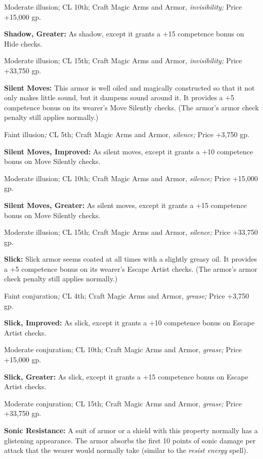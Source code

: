 Moderate illusion; CL 10th; Craft Magic Arms and Armor, \textit{invisibility; }Price 
+15,000 gp.

\textbf{Shadow, Greater:} As shadow, except it grants a +15 competence bonus on 
Hide checks.

Moderate illusion; CL 15th; Craft Magic Arms and Armor, \textit{invisibility; }Price 
+33,750 gp.

\textbf{Silent Moves: }This armor is well oiled and magically constructed so that 
it not only makes little sound, but it dampens sound around it. It provides a +5 
competence bonus on its wearer's Move Silently checks. (The armor's armor check 
penalty still applies normally.)

Faint illusion\textit{; }CL 5th; Craft Magic Arms and Armor, \textit{silence; }Price 
+3,750 gp.

\textbf{Silent Moves, Improved:} As silent moves, except it grants a +10 competence 
bonus on Move Silently checks.

Moderate illusion; CL 10th; Craft Magic Arms and Armor, \textit{silence; }Price 
+15,000 gp.

\textbf{Silent Moves, Greater: }As silent moves, except it grants a +15 competence 
bonus on Move Silently checks.

Moderate illusion; CL 15th; Craft Magic Arms and Armor, \textit{silence; }Price 
+33,750 gp.

\textbf{Slick:} Slick armor seems coated at all times with a slightly greasy oil. 
It provides a +5 competence bonus on its wearer's Escape Artist checks. (The armor's 
armor check penalty still applies normally.)

Faint conjuration\textit{; }CL 4th; Craft Magic Arms and Armor, \textit{grease; 
}Price +3,750 gp.

\textbf{Slick, Improved: }As slick, except it grants a +10 competence bonus on 
Escape Artist checks.

Moderate conjuration; CL 10th; Craft Magic Arms and Armor, \textit{grease; }Price 
+15,000 gp.

\textbf{Slick, Greater:} As slick, except it grants a +15 competence bonus on Escape 
Artist checks.

Moderate conjuration; CL 15th; Craft Magic Arms and Armor, \textit{grease; }Price 
+33,750 gp.

\textbf{Sonic Resistance: }A suit of armor or a shield with this property normally 
has a glistening appearance. The armor absorbs the first 10 points of sonic damage 
per attack that the wearer would normally take (similar to the \textit{resist energy 
}spell).

